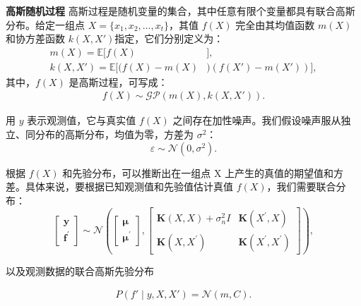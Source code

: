 \textbf{高斯随机过程} 高斯过程是随机变量的集合，其中任意有限个变量都具有联合高斯分布。给定一组点 $X = \{x_1,x_2,\ldots,x_t\}$，其值 $f(X)$ 完全由其均值函数 $m(X)$ 和协方差函数 $k(X,X')$指定，它们分别定义为：
\begin{equation}
\begin{aligned}
m(X)=\mathbb{E}[f(X)&], \\
k(X,X')=\mathbb{E}[(f(X)-m(X)&)(f(X')-m(X'))],
\end{aligned}
\end{equation}
其中，$f(X)$ 是高斯过程，可写成：
\begin{equation}
\begin{aligned}
f(X) \sim \mathcal{GP}(m(X), k(X,X')).
\end{aligned}
\end{equation}

用 $y$ 表示观测值，它与真实值 $f(X)$ 之间存在加性噪声。我们假设噪声服从独立、同分布的高斯分布，均值为零，方差为 $\sigma^2$：
$$\varepsilon \sim \mathcal{N}(0,\sigma^2).$$

根据 $f(X)$ 和先验分布，可以推断出在一组点 X 上产生的真值的期望值和方差。具体来说，要根据已知观测值和先验值估计真值 $f(X)$，我们需要联合分布：
\begin{equation}
\left[\begin{array}{c}
\boldsymbol{y} \\
\boldsymbol{f}^{\prime}
\end{array}\right] \sim \mathcal{N}\left(\left[\begin{array}{c}
\boldsymbol{\mu} \\
\boldsymbol{\mu}^{\prime}
\end{array}\right],\left[\begin{array}{cc}
\boldsymbol{K}(X, X)+\sigma_{n}^{2} I & \boldsymbol{K}\left(X^{\prime}, X\right) \\
\boldsymbol{K}\left(X, X^{\prime}\right) & \boldsymbol{K}\left(X^{\prime}, X^{\prime}\right)
\end{array}\right]\right),
\end{equation}

以及观测数据的联合高斯先验分布

\begin{equation}
\begin{aligned}
P(f'\mid y,X,X')=\mathcal{N}(m,C).
\end{aligned}
\end{equation}

